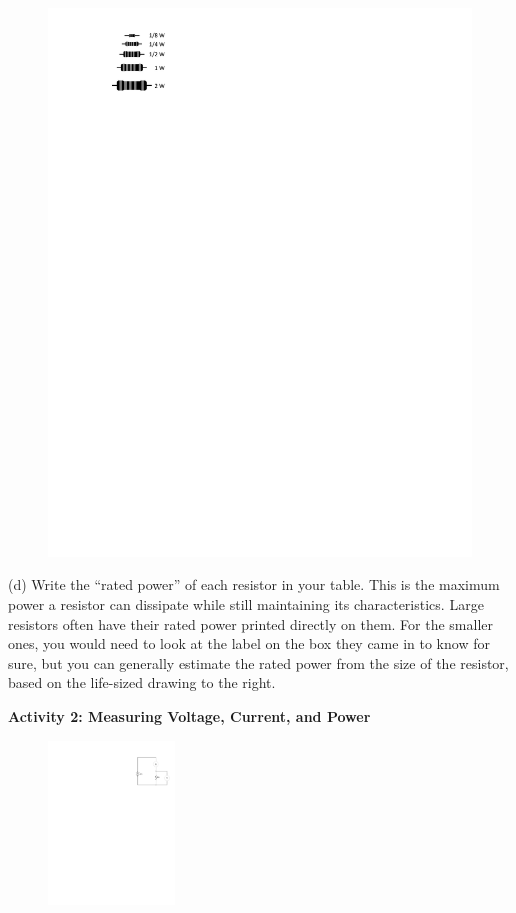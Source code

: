 \begin{figure}
    \vspace{-0.5 in}
    \includegraphics{electric_power/resistor_sizes.pdf}
\end{figure}

(d) Write the ``rated power'' of each resistor in your table.  This is the maximum power a resistor can dissipate while still maintaining its characteristics.  Large resistors often have their rated power printed directly on them.  For the smaller ones, you would need to look at the label on the box they came in to know for sure, but you can generally estimate the rated power from the size of the resistor, based on the life-sized drawing to the right. 


\pagebreak
\textbf{Activity 2: Measuring Voltage, Current, and Power}

\begin{figure}
    \vspace{-0.4 in}
    \includegraphics[width=0.3\textwidth]{electric_power/circ_diagram_bw.pdf}
\end{figure}

